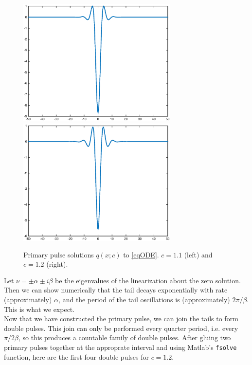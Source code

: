 \documentclass[12pt]{article}
\begin{document}
\begin{figure}[H]
\centering
\includegraphics[width=8cm]{single11.eps}
\includegraphics[width=8cm]{single12.eps}
\label{fig:single2}
\caption{Primary pulse solutions $q(x;c)$ to \eqref{eqODE}. $c = 1.1$ (left) and $c = 1.2$ (right).}
\end{figure}

Let $\nu = \pm \alpha \pm i \beta$ be the eigenvalues of the linearization about the zero solution. Then we can show numerically that the tail decays exponentially with rate (approximately) $\alpha$, and the period of the tail oscillations is (approximately) $2 \pi / \beta$. This is what we expect. \\

Now that we have constructed the primary pulse, we can join the tails to form double pulses. This join can only be performed every quarter period, i.e. every $\pi / 2 \beta$, so this produces a countable family of double pulses. After gluing two primary pulses together at the approprate interval and using Matlab's \texttt{fsolve} function, here are the first four double pulses for $c = 1.2$.
\end{document}
